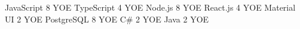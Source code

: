 \begin{cvhonors}
  \cvhonor
    {JavaScript}
    {8 YOE}
    {\faStar \faStar \faStar \faStar \faStar}
    {}
  \cvhonor
    {TypeScript }
    {4 YOE}
    {\faStar \faStar \faStar \faStar \faStarO}
    {}
  \cvhonor
    {Node.js}
    {8 YOE}
    {\faStar \faStar \faStar \faStar \faStar}
    {} 
  \cvhonor
    {React.js }
    {4 YOE}
    {\faStar \faStar \faStar \faStar \faStarO}
    {} 
  \cvhonor
    {Material UI }
    {2 YOE}
    {\faStar \faStar \faStar \faStarO \faStarO}
    {}
  \cvhonor
    {PostgreSQL}
    {8 YOE}
    {\faStar \faStar \faStar \faStar \faStar }
    {}  
  \cvhonor
    {C\#}
    {2 YOE}
    {\faStar \faStar \faStar \faStarO \faStarO}
    {}  
  \cvhonor
    {Java}
    {2 YOE}
    {\faStar \faStar \faStar \faStarO \faStarO}
    {}      
\end{cvhonors}
